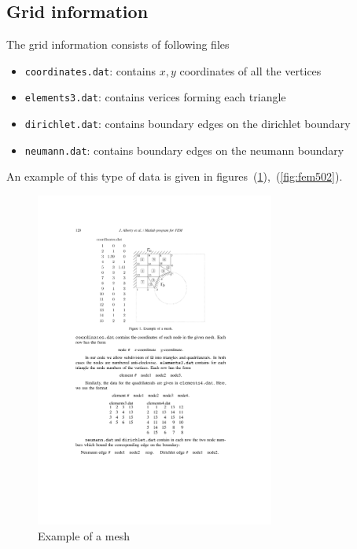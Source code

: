 \documentclass[12pt]{article}
\begin{document}
\subsection{Grid information}
The grid information consists of following files
\begin{itemize}
\item {\tt coordinates.dat}: contains $x,y$ coordinates of all the vertices

\item {\tt elements3.dat}: contains verices forming each triangle

\item {\tt dirichlet.dat}: contains boundary edges on the dirichlet boundary

\item {\tt neumann.dat}: contains boundary edges on the neumann boundary

\end{itemize}
An example of this type of data is given in figures~(\ref{fig:fem501}),~(\ref{fig:fem502}).
\begin{figure}
\begin{center}
\includegraphics[width=0.7\textwidth]{fem50_1}
\caption{Example of a mesh}
\label{fig:fem501}
\end{center}
\end{figure}
\end{document}
